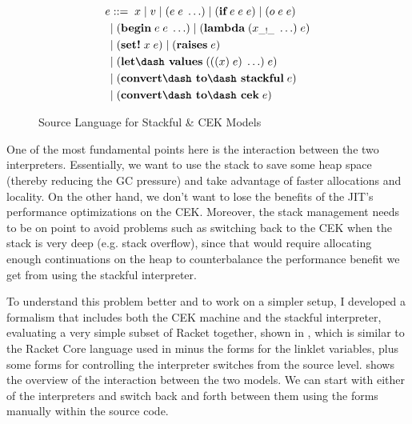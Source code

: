\begin{figure}
  \vspace{-0.6cm}
  \footnotesize
  \begin{mdframed}
    \begin{align*}
      e &::=\; x\; |\; v\; |\; (e\; e\; \ldots)\; |\; (\textbf{if}\; e\; e\; e)\; |\; (o\; e\; e)\; \\
      \; &|\; (\textbf{begin}\; e\; e\; \ldots)\; |\; (\textbf{lambda}\; (x_{\_!\_}\; \ldots)\; e)\\
      \; &|\; (\textbf{set!}\; x\; e)\; |\; (\textbf{raises}\; e)\\
      \; &|\; (\textbf{let\dash values}\; (((x)\; e)\; \ldots)\; e)\\
      \; &|\; (\textbf{convert\dash to\dash stackful}\; e)\\
      \; &|\; (\textbf{convert\dash to\dash cek}\; e)
    \end{align*}
  \caption[hede]{Source Language for Stackful \& CEK Models}
  \label{fig:st-cek--source}
  \end{mdframed}
\end{figure}

One of the most fundamental points here is the interaction between the
two interpreters. Essentially, we want to use the stack to save some
heap space (thereby reducing the GC pressure) and take advantage of
faster allocations and locality. On the other hand, we don't want to
lose the benefits of the JIT's performance optimizations on the
CEK. Moreover, the stack management needs to be on point to avoid
problems such as switching back to the CEK when the stack is very deep
(e.g. stack overflow), since that would require allocating enough
continuations on the heap to counterbalance the performance benefit we
get from using the stackful interpreter.

To understand this problem better and to work on a simpler setup, I
developed a formalism that includes both the CEK machine and the
stackful interpreter, evaluating a very simple subset of Racket
together, shown in , which is similar to the
Racket Core language used in  minus
the forms for the linklet variables, plus some 
forms for controlling the interpreter switches from the source
level.  shows the overview of the
interaction between the two models. We can start with either of the
interpreters and switch back and forth between them using the
 forms manually within the source code.

